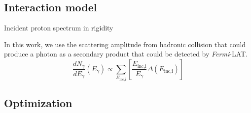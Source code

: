 \subsection{Interaction model}

Incident proton spectrum in rigidity 

In this work, we use the scattering amplitude from hadronic collision \cite{K&Omodel} that could produce a photon as a secondary product that could be detected by \textit{Fermi}-LAT.
\begin{equation}
    \frac{dN_{\gamma}}{dE_\gamma}(E_\gamma)
    \propto \sum_{E_{\textrm{inc,i}}}
    \left[\frac{E_{\text{inc,i}}}{E_{\gamma}}\Delta(E_{\textrm{inc,i}}) \right]
\end{equation}

\subsection{Optimization}


